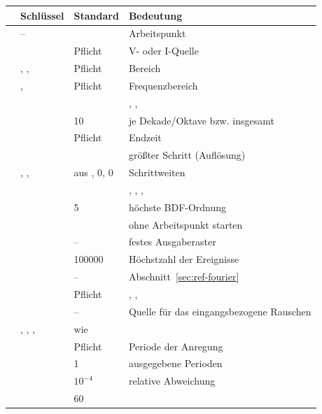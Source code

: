 \begin{longtable}{@{}P{1.8cm}P{3.6cm}P{3.4cm}P{5.0cm}@{}}
  \toprule
   & Schlüssel & Standard & Bedeutung \\
  \midrule
  \endhead
  \bottomrule
  \endfoot
   & – & & Arbeitspunkt \\
  \addlinespace[0.8ex]
   &  & Pflicht & V- oder I-Quelle \\
   & , ,  & Pflicht & Bereich \\
  \addlinespace[0.8ex]
   & ,  & Pflicht & Frequenzbereich \\
   &  &  & , ,  \\
   &  & 10 & je Dekade/Oktave bzw. insgesamt \\
  \addlinespace[0.8ex]
   &  & Pflicht & Endzeit \\
   &  &  & größter Schritt (Auflösung) \\
   & , ,  & aus , 0, 0 & Schrittweiten \\
   &  &  & , , ,  \\
   &  & 5 & höchste BDF-Ordnung \\
   &  &  & ohne Arbeitspunkt starten \\
   &  & – & festes Ausgaberaster \\
   &  & 100000 & Höchstzahl der Ereignisse \\
   &  & – & Abschnitt~\ref{sec:ref-fourier} \\
  \addlinespace[0.8ex]
   &  & Pflicht & , ,  \\
   &  & – & Quelle für das eingangsbezogene Rauschen \\
   & , , ,  & wie  & \\
  \addlinespace[0.8ex]
   &  & Pflicht & Periode der Anregung \\
   &  & 1 & ausgegebene Perioden \\
   &  & $10^{-4}$ & relative Abweichung \\
   &  & 60 & \\

\end{longtable}

